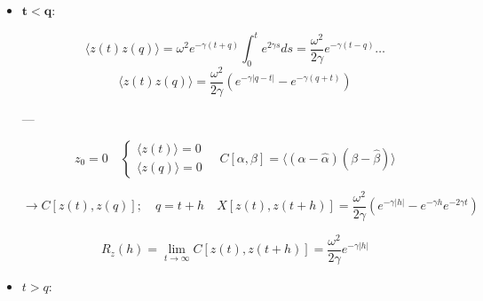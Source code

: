 \begin{itemize}
    \item $\boldsymbol{t < q}$: 
    
        $$
        \langle z(t) z(q) \rangle = \omega^2 e^{-\gamma (t + q)} \int_0^t e^{2 \gamma s} ds 
        =
        \dfrac{\omega^2}{2 \gamma} e^{-\gamma (t - q)} \dots
        $$
        $$
        \langle z(t) z(q) \rangle = \dfrac{\omega^2}{2 \gamma} \left( e^{-\gamma |q - t|} - e^{-\gamma (q + t)} \right)
        $$

---

        $$
        z_0 = 0
        \quad
        \begin{cases}
        \langle z(t) \rangle = 0
        \\
        \langle z(q) \rangle = 0
        \end{cases}
        \quad
        C[\alpha, \beta] = \langle (\alpha - \hat \alpha)(\beta - \hat \beta) \rangle
        $$

        $$
        \rightarrow C[z(t), z(q)]; \quad q = t + h \quad X[z(t), z(t+h)] = \dfrac{\omega^2}{2 \gamma} \left( e^{-\gamma |h|} - e^{-\gamma h} e^{-2 \gamma t} \right)
        $$
        
        $$
        R_z(h) = \lim_{t \to \infty} C[z(t), z(t+h)] = \dfrac{\omega^2}{2 \gamma} e^{-\gamma |h|}
        $$
        
    \item $t > q$:
    

\end{itemize}